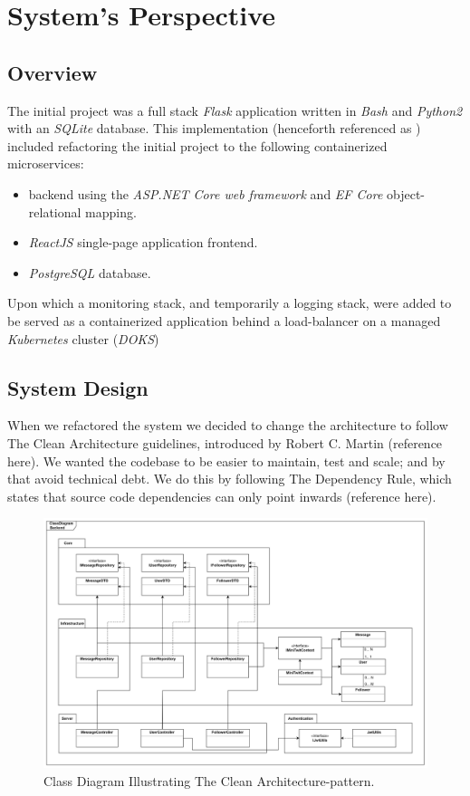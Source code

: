 \section{System's Perspective}
\label{sec:systems_perspective}

\subsection{Overview}
\label{subsec:systems_perspective_overview}
The initial project was a full stack \textit{Flask} application written in \textit{Bash} and \textit{Python2} with an \textit{SQLite} database. 
This implementation (henceforth referenced as \mini) included refactoring the initial project to the following containerized microservices:
\begin{itemize}
    \item \textit{\cs}backend using the \textit{ASP.NET Core web framework} and \textit{EF Core} object-relational mapping.
    \item \textit{ReactJS} single-page application frontend.
    \item \textit{PostgreSQL} database.
\end{itemize}
Upon which a monitoring stack, and temporarily a logging stack, were added to be served as a containerized application behind a load-balancer on a managed \textit{Kubernetes} cluster (\textit{DOKS})

\subsection{System Design}
\label{subsec:system_design}
When we refactored the system we decided to change the architecture to follow The Clean Architecture guidelines, introduced by Robert C. Martin (reference here). We wanted the codebase to be easier to maintain, test and scale; and by that avoid technical debt.
We do this by following The Dependency Rule, which states that source code dependencies can only point inwards (reference here).

\begin{figure}[H]
    \centering
    \includegraphics[scale=0.088]{images/package_class-diagrams/class_diagram_backend.png}
    \caption{Class Diagram Illustrating The Clean Architecture-pattern.}
    \label{fig:diagramClass}
\end{figure}

